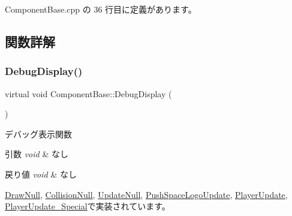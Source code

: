  Component\+Base.\+cpp の 36 行目に定義があります。



\subsection{関数詳解}
\mbox{\label{class_component_base_a36ae7d27ad9d756fa245bad443020407}} 
\subsubsection{\texorpdfstring{Debug\+Display()}{DebugDisplay()}}
{\footnotesize\ttfamily virtual void Component\+Base\+::\+Debug\+Display (\begin{DoxyParamCaption}{ }\end{DoxyParamCaption})\hspace{0.3cm}{\ttfamily [pure virtual]}}



デバッグ表示関数 


\begin{DoxyParams}{引数}
{\em void} & なし \\
\hline
\end{DoxyParams}

\begin{DoxyRetVals}{戻り値}
{\em void} & なし \\
\hline
\end{DoxyRetVals}


\mbox{\hyperlink{class_draw_null_aed3bbedfe8db8daf7cafa143750f2114}{Draw\+Null}}, \mbox{\hyperlink{class_collision_null_a098fcf2c8ecc3c31706b720fbe852aca}{Collision\+Null}}, \mbox{\hyperlink{class_update_null_a98c7241e5ef276510830eb6df9ed0fbb}{Update\+Null}}, \mbox{\hyperlink{class_push_space_logo_update_ab18a0c905455da17f9e2f1fe5f0c34e6}{Push\+Space\+Logo\+Update}}, \mbox{\hyperlink{class_player_update_ac15fd0faf356c6e66f6c62c2b6b8d3ac}{Player\+Update}}, \mbox{\hyperlink{class_player_update___special_a6253000b53b2c5bc73ce0ed4d3b4a82a}{Player\+Update\+\_\+\+Special}}で実装されています。

\mbox{\label{class_component_base_ab9517b92e45e084b1cc450c147e16642}} 
